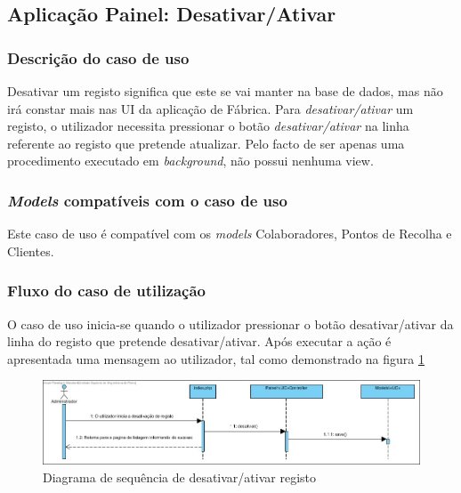 \subsection{Aplicação Painel: Desativar/Ativar}
\subsubsection*{Descrição do caso de uso}
Desativar um registo significa que este se vai manter na base de dados, mas não irá constar mais nas UI da aplicação de Fábrica. Para \textit{desativar/ativar} um registo, o utilizador necessita pressionar o botão \textit{desativar/ativar} na linha referente ao registo que pretende atualizar. Pelo facto de ser apenas uma procedimento executado em \textit{background}, não possui nenhuma view.

\subsubsection*{\textit{Models} compatíveis com o caso de uso}
Este caso de uso é compatível com os \textit{models} Colaboradores, Pontos de Recolha e Clientes.

\subsubsection*{Fluxo do caso de utilização}
O caso de uso inicia-se quando o utilizador pressionar o botão desativar/ativar da linha do registo que pretende desativar/ativar. Após executar a ação é apresentada uma mensagem ao utilizador, tal como demonstrado na figura \ref{fig:sd_desativar}


\begin{figure}[H] 
	\begin{center}
		\includegraphics[width=\textwidth,keepaspectratio]{figuras/Diagramas_vp/SD_Painel_5_Desativar.jpg}
		\caption{Diagrama de sequência de desativar/ativar registo}
		\label{fig:sd_desativar} 
	\end{center}
\end{figure}